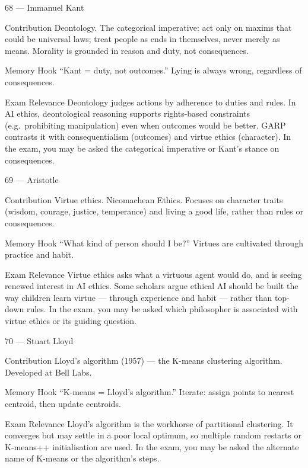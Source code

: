 \documentclass[aspectratio=169,8pt]{beamer}
\begin{document}
	\begin{frame}{68 --- Immanuel Kant}
		\begin{block}{Contribution}
			Deontology. The categorical imperative: act only on maxims that could be universal laws; treat people as ends in themselves, never merely as means. Morality is grounded in reason and duty, not consequences.
		\end{block}
		\begin{block}{Memory Hook}
			``Kant = duty, not outcomes.'' Lying is always wrong, regardless of consequences.
		\end{block}
		\begin{block}{Exam Relevance}
			Deontology judges actions by adherence to duties and rules. In AI ethics, deontological reasoning supports rights-based constraints (e.g.\ prohibiting manipulation) even when outcomes would be better. GARP contrasts it with consequentialism (outcomes) and virtue ethics (character). In the exam, you may be asked the categorical imperative or Kant's stance on consequences.
		\end{block}
	\end{frame}
	
	\begin{frame}{69 --- Aristotle}
		\begin{block}{Contribution}
			Virtue ethics. Nicomachean Ethics. Focuses on character traits (wisdom, courage, justice, temperance) and living a good life, rather than rules or consequences.
		\end{block}
		\begin{block}{Memory Hook}
			``What kind of person should I be?'' Virtues are cultivated through practice and habit.
		\end{block}
		\begin{block}{Exam Relevance}
			Virtue ethics asks what a virtuous agent would do, and is seeing renewed interest in AI ethics. Some scholars argue ethical AI should be built the way children learn virtue --- through experience and habit --- rather than top-down rules. In the exam, you may be asked which philosopher is associated with virtue ethics or its guiding question.
		\end{block}
	\end{frame}
	
	\begin{frame}{70 --- Stuart Lloyd}
		\begin{block}{Contribution}
			Lloyd's algorithm (1957) --- the K-means clustering algorithm. Developed at Bell Labs.
		\end{block}
		\begin{block}{Memory Hook}
			``K-means = Lloyd's algorithm.'' Iterate: assign points to nearest centroid, then update centroids.
		\end{block}
		\begin{block}{Exam Relevance}
			Lloyd's algorithm is the workhorse of partitional clustering. It converges but may settle in a poor local optimum, so multiple random restarts or K-means++ initialisation are used. In the exam, you may be asked the alternate name of K-means or the algorithm's steps.
		\end{block}
	\end{frame}
	
\end{document}
